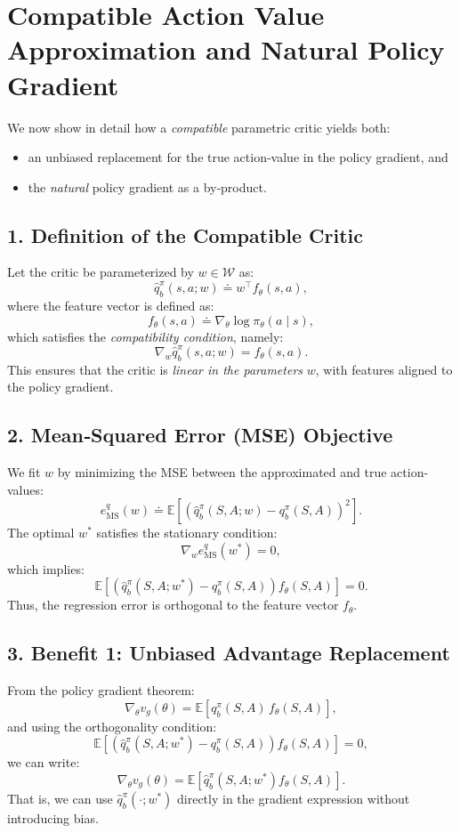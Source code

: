 \section{Compatible Action Value Approximation and Natural Policy Gradient}

We now show in detail how a \emph{compatible} parametric critic yields both:
\begin{itemize}
  \item an unbiased replacement for the true action‐value in the policy gradient, and
  \item the \emph{natural} policy gradient as a by‐product.
\end{itemize}

\subsection*{1. Definition of the Compatible Critic}

Let the critic be parameterized by \( w \in \mathcal{W} \) as:
\[
\hat{q}_b^\pi(s,a;w) \doteq w^\top f_\theta(s,a),
\]
where the feature vector is defined as:
\[
f_\theta(s,a) \doteq \nabla_\theta \log \pi_\theta(a \mid s),
\]
which satisfies the \emph{compatibility condition}, namely:
\[
\nabla_w \hat{q}_b^\pi(s,a;w) = f_\theta(s,a).
\]
This ensures that the critic is \emph{linear in the parameters} \(w\), with features aligned to the policy gradient.

\subsection*{2. Mean‐Squared Error (MSE) Objective}

We fit \(w\) by minimizing the MSE between the approximated and true action-values:
\[
e_{\text{MS}}^q(w) \doteq \mathbb{E}\left[\left(\hat{q}_b^\pi(S,A;w) - q_b^\pi(S,A)\right)^2\right].
\]
The optimal \(w^*\) satisfies the stationary condition:
\[
\nabla_w e_{\text{MS}}^q(w^*) = 0,
\]
which implies:
\[
\mathbb{E}\left[(\hat{q}_b^\pi(S,A;w^*) - q_b^\pi(S,A)) f_\theta(S,A)\right] = 0.
\]
Thus, the regression error is orthogonal to the feature vector \(f_\theta\).

\subsection*{3. Benefit 1: Unbiased Advantage Replacement}

From the policy gradient theorem:
\[
\nabla_\theta v_g(\theta) = \mathbb{E}\left[q_b^\pi(S,A)\, f_\theta(S,A)\right],
\]
and using the orthogonality condition:
\[
\mathbb{E}\left[(\hat{q}_b^\pi(S,A;w^*) - q_b^\pi(S,A)) f_\theta(S,A)\right] = 0,
\]
we can write:
\[
\nabla_\theta v_g(\theta) 
= \mathbb{E}\left[\hat{q}_b^\pi(S,A;w^*) f_\theta(S,A)\right].
\]
That is, we can use \(\hat{q}_b^\pi(\cdot;w^*)\) directly in the gradient expression without introducing bias.

